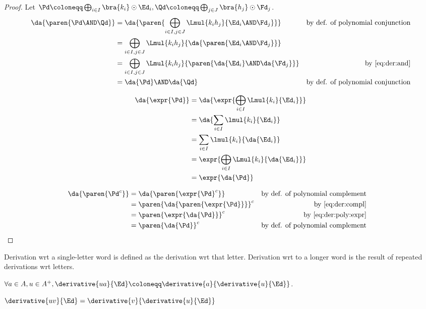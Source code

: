 \documentclass[a4paper,USenglish]{lipics}
\begin{document}
\begin{proof}
  Let
  $\Pd \coloneqq \bigoplus_{i\in I}\bra{k_i} \odot \Ed_i, \Qd \coloneqq
  \bigoplus_{j\in J}\bra{h_j} \odot \Fd_j$.
  \begin{align*}
    \da{\paren{\Pd \AND \Qd}}
    &= \da{\paren{\bigoplus_{i\in I, j\in J} \Lmul{k_ih_j}{\Ed_i \AND \Fd_j}}}  & \text{by def. of polynomial conjunction}\\
    &= \bigoplus_{i\in I, j\in J} \Lmul{k_ih_j}{\da{\paren{\Ed_i \AND \Fd_j}}}\\
    &= \bigoplus_{i\in I, j\in J} \Lmul{k_ih_j}{\paren{\da{\Ed_i} \AND \da{\Fd_j}}} & \text{by \cref{eq:der:and}}\\
    &= \da{\Pd} \AND \da{\Qd} & \text{by def. of polynomial conjunction}
  \end{align*}

  \begin{align*}
    \da{\expr{\Pd}}
    &= \da{\expr{\bigoplus_{i\in I} \Lmul{k_i}{\Ed_i}}}\\
    &= \da{\sum_{i\in I} \lmul{k_i}{\Ed_i}}\\
    &= \sum_{i\in I} \lmul{k_i}{\da{\Ed_i}}\\
    &= \expr{\bigoplus_{i\in I} \Lmul{k_i}{\da{\Ed_i}}}\\
    &= \expr{\da{\Pd}}
  \end{align*}

  \begin{align*}
    \da{\paren{\Pd^c}}
    &= \da{\paren{\expr{\Pd}^c}}         & \text{by def. of polynomial complement} \\
    &= \paren{\da{\paren{\expr{\Pd}}}}^c & \text{by \cref{eq:der:compl}} \\
    &= \paren{\expr{\da{\Pd}}}^c         & \text{by \cref{eq:der:poly:expr}} \\
    &= \paren{\da{\Pd}}^c                & \text{by def. of polynomial complement}
    & \hfill\qedhere
  \end{align*}
\end{proof}

Derivation wrt a single-letter word is defined as the derivation wrt that
letter.  Derivation wrt to a longer word is the result of repeated
derivations wrt letters.
\begin{Definition}
  $\forall a \in A, u \in A^+, \derivative{ua}{\Ed} \coloneqq
  \derivative{a}{\derivative{u}{\Ed}}$.
\end{Definition}

\begin{Lemma}
  \label{lem:der:words}
  $\derivative{uv}{\Ed} = \derivative{v}{\derivative{u}{\Ed}}$
\end{Lemma}
\end{document}
